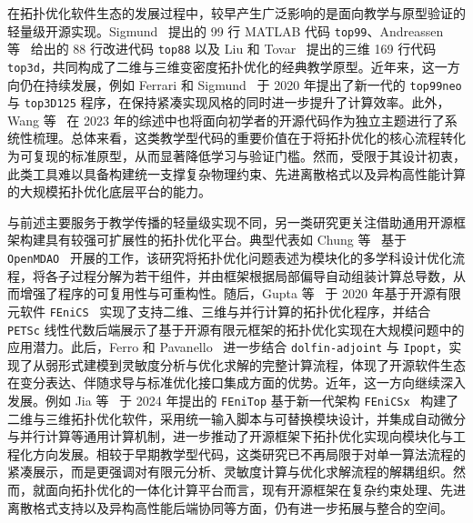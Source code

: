 在拓扑优化软件生态的发展过程中，较早产生广泛影响的是面向教学与原型验证的轻量级开源实现。Sigmund~\cite{sigmund99LineTopology2001a} 提出的 99 行 MATLAB 代码 \texttt{top99}、Andreassen 等~\cite{andreassenEfficientTopologyOptimization2011a} 给出的 88 行改进代码 \texttt{top88} 以及 Liu 和 Tovar~\cite{liuEfficient3DTopology2014a} 提出的三维 169 行代码 \texttt{top3d}，共同构成了二维与三维变密度拓扑优化的经典教学原型。近年来，这一方向仍在持续发展，例如 Ferrari 和 Sigmund~\cite{ferrariNewGeneration992020a} 于 2020 年提出了新一代的 \texttt{top99neo} 与 \texttt{top3D125} 程序，在保持紧凑实现风格的同时进一步提升了计算效率。此外，Wang 等~\cite{wangOpenSourceCodesTopology2023a} 在 2023 年的综述中也将面向初学者的开源代码作为独立主题进行了系统性梳理。总体来看，这类教学型代码的重要价值在于将拓扑优化的核心流程转化为可复现的标准原型，从而显著降低学习与验证门槛。然而，受限于其设计初衷，此类工具难以具备构建统一支撑复杂物理约束、先进离散格式以及异构高性能计算的大规模拓扑优化底层平台的能力。

与前述主要服务于教学传播的轻量级实现不同，另一类研究更关注借助通用开源框架构建具有较强可扩展性的拓扑优化平台。典型代表如 Chung 等~\cite{chungTopologyOptimizationOpenMDAO2019a} 基于 \texttt{OpenMDAO}~\cite{grayOpenMDAOOpensourceFramework2019} 开展的工作，该研究将拓扑优化问题表述为模块化的多学科设计优化流程，将各子过程分解为若干组件，并由框架根据局部偏导自动组装计算总导数，从而增强了程序的可复用性与可重构性。随后，Gupta 等~\cite{gupta55lineCodeLargescale2020a} 于 2020 年基于开源有限元软件 \texttt{FEniCS}~\cite{alnaesFEniCSProjectVersion2015} 实现了支持二维、三维与并行计算的拓扑优化程序，并结合 \texttt{PETSc} 线性代数后端展示了基于开源有限元框架的拓扑优化实现在大规模问题中的应用潜力。此后，Ferro 和 Pavanello~\cite{marinferroSimpleEfficientStructural2023a} 进一步结合 \texttt{dolfin-adjoint} 与 \texttt{Ipopt}，实现了从弱形式建模到灵敏度分析与优化求解的完整计算流程，体现了开源软件生态在变分表达、伴随求导与标准优化接口集成方面的优势。近年，这一方向继续深入发展。例如 Jia 等~\cite{jiaFEniTopSimpleFEniCSx2024a} 于 2024 年提出的 \texttt{FEniTop} 基于新一代架构 \texttt{FEniCSx}~\cite{barattaDOLFINxNextGeneration2023} 构建了二维与三维拓扑优化软件，采用统一输入脚本与可替换模块设计，并集成自动微分与并行计算等通用计算机制，进一步推动了开源框架下拓扑优化实现向模块化与工程化方向发展。相较于早期教学型代码，这类研究已不再局限于对单一算法流程的紧凑展示，而是更强调对有限元分析、灵敏度计算与优化求解流程的解耦组织。然而，就面向拓扑优化的一体化计算平台而言，现有开源框架在复杂约束处理、先进离散格式支持以及异构高性能后端协同等方面，仍有进一步拓展与整合的空间。

